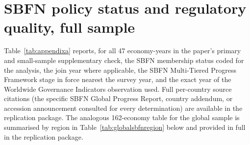 \documentclass[12pt]{article}
\begin{document}
\section{SBFN policy status and regulatory quality, full sample}
\label{app:sbfn}

Table~\ref{tab:appendixa} reports, for all 47 economy-years in the paper's primary and small-sample
supplementary check, the SBFN membership status coded for the analysis, the join year where
applicable, the SBFN Multi-Tiered Progress Framework stage in force nearest the survey year, and the
exact year of the Worldwide Governance Indicators observation used. Full per-country source
citations (the specific SBFN Global Progress Report, country addendum, or accession announcement
consulted for every determination) are available in the replication package. The analogous
162-economy table for the global sample is summarised by region in Table~\ref{tab:globalsbfnregion}
below and provided in full in the replication package.
\end{document}
